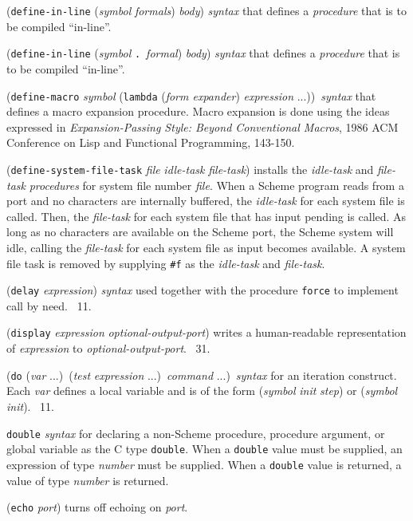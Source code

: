 \documentclass[10pt,twocolumn]{article}
\begin{document}
(\texttt{define-in-line} (\emph{symbol} \emph{formals}) \emph{body})
\emph{syntax} that defines a \emph{procedure} that is to be compiled
``in-line''.

(\texttt{define-in-line} (\emph{symbol} \texttt{.}\ \emph{formal})
\emph{body}) \emph{syntax} that defines a \emph{procedure} that is to
be compiled ``in-line''.

(\texttt{define-macro} \emph{symbol} (\texttt{lambda} (\emph{form
  expander}) \emph{expression} ...))\ \emph{syntax} that defines a
macro expansion procedure.  Macro expansion is done using the ideas
expressed in \emph{Expansion-Passing Style: Beyond Conventional
  Macros}, 1986 ACM Conference on Lisp and Functional Programming,
143-150.

(\texttt{define-system-file-task} \emph{file} \emph{idle-task}
\emph{file-task}) installs the \emph{idle-task} and \emph{file-task}
\emph{procedures} for system file number \emph{file}.  When a Scheme
program reads from a port and no characters are internally buffered,
the \emph{idle-task} for each system file is called.  Then, the
\emph{file-task} for each system file that has input pending is
called.  As long as no characters are available on the Scheme port,
the Scheme system will idle, calling the \emph{file-task} for each
system file as input becomes available.  A system file task is removed
by supplying \texttt{\#f} as the \emph{idle-task} and
\emph{file-task}.

(\texttt{delay} \emph{expression}) \emph{syntax} used together with
the procedure \texttt{force} to implement call by need.  \RRRRRS~11.

(\texttt{display} \emph{expression} \emph{optional-output-port})
writes a human-readable representation of \emph{expression} to
\emph{optional-output-port}.  \RRRRRS~31.

(\texttt{do} (\emph{var} ...)\ (\emph{test} \emph{expression}
...)\ \emph{command} ...)\ \emph{syntax} for an iteration construct.
Each \emph{var} defines a local variable and is of the form
(\emph{symbol} \emph{init} \emph{step}) or (\emph{symbol}
\emph{init}).  \RRRRRS~11.

\texttt{double} \emph{syntax} for declaring a non-Scheme procedure,
procedure argument, or global variable as the C type
\texttt{double}. When a \texttt{double} value must be supplied, an
expression of type \emph{number} must be supplied.  When a
\texttt{double} value is returned, a value of type \emph{number} is
returned.

(\texttt{echo} \emph{port}) turns off echoing on \emph{port}.
\end{document}

